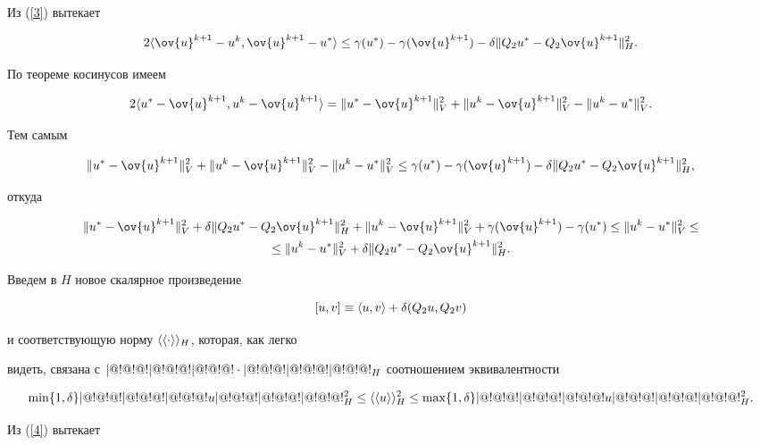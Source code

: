 Из (\ref{3}) вытекает


$$


2\la \ov{u}^{k+1}-u^k,\ov{u}^{k+1}-u^*\ra \le


\gamma(u^*)-\gamma(\ov{u}^{k+1})-\delta\|Q_2u^*-Q_2\ov{u}^{k+1}\|^2_H.


$$


По теореме косинусов имеем


$$


2\la u^*-\ov{u}^{k+1},u^k-\ov{u}^{k+1}\ra =\|u^*-\ov{u}^{k+1}\|^2_V+


\|u^k-\ov{u}^{k+1}\|^2_V-\|u^k-u^*\|^2_V.


$$


Тем самым


$$


\|u^*-\ov{u}^{k+1}\|^2_V+\|u^k-\ov{u}^{k+1}\|^2_V-


\|u^k-u^*\|^2_V\le


\gamma(u^*)-\gamma(\ov{u}^{k+1})-\delta\|Q_2u^*-Q_2\ov{u}^{k+1}\|^2_H,


$$


откуда


\begin{multline}


\label{4}


\|u^*-\ov{u}^{k+1}\|^2_V+\delta\|Q_2u^*-Q_2\ov{u}^{k+1}\|^2_H+\|u^k-\ov{u}^{k+1}\|^2_V


+\gamma(\ov{u}^{k+1})-\gamma(u^*)\le\|u^k-u^*\|^2_V\le \\


%


\le\|u^k-u^*\|^2_V+\delta\|Q_2u^*-Q_2\ov{u}^{k+1}\|^2_H.


\end{multline}


Введем в $H$ новое скалярное произведение


$$


[u,v]\equiv\la u,v\ra +\delta(Q_2u,Q_2v)


$$


и соответствующую норму $\langle\langle\cdot\rangle\rangle_H$, которая, как легко


видеть, связана с $|@!@!@!|@!@!@!|@!@!@!\cdot|@!@!@!|@!@!@!|@!@!@!_H$ соотношением эквивалентности


$$


\min\{1,\delta\}\trivert u\trivert^2_H\le\la\la u\ra\ra^2_H\le


\max\{1,\delta\}\trivert u\trivert^2_H.


$$


Из (\ref{4}) вытекает


